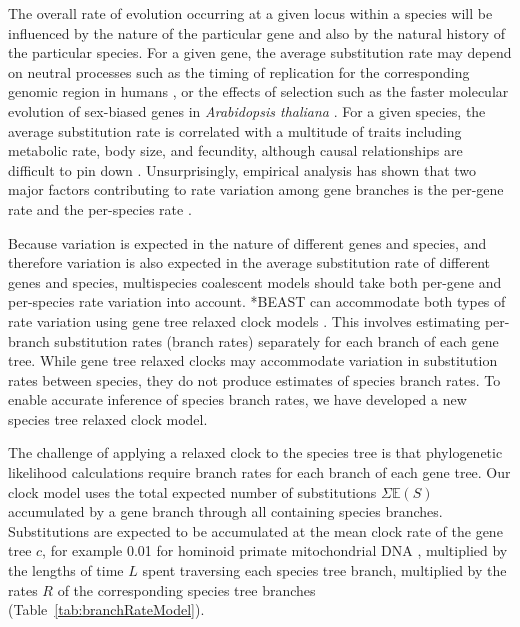 \documentclass[nogrid]{MBE}%
\begin{document}
The overall rate of evolution occurring at a given locus within a species will
be influenced by the nature of the particular gene and also by the natural
history of the particular species. For a given gene, the average substitution
rate may depend on neutral processes such as the timing of replication for the
corresponding genomic region in humans \citep{Stamatoyannopoulos2009}, or the
effects of selection such as the faster molecular evolution of sex-biased genes
in \textit{Arabidopsis thaliana} \citep{Gossmann01032014}. For a given species,
the average substitution rate is correlated with a multitude of traits including
metabolic rate, body size, and fecundity, although causal relationships are
difficult to pin down \citep{Bromham2503}. Unsurprisingly, empirical analysis
has shown that two major factors contributing to rate variation among gene
branches is the per-gene rate and the per-species rate
\citep{Rasmussen01122007}.

Because variation is expected in the nature of different genes and species, and
therefore variation is also expected in the average substitution rate of different
genes and species, multispecies coalescent models should take both per-gene and
per-species rate variation into account. *BEAST can accommodate both types of
rate variation using gene tree relaxed clock models \citep[for examples see][]{Berv2014120, Lambert2015146}.
This involves estimating per-branch substitution rates (branch rates) separately
for each branch of each gene tree. While gene tree relaxed clocks may
accommodate variation in substitution rates between species, they do not produce
estimates of species branch rates. To enable accurate inference of species
branch rates, we have developed a new species tree relaxed clock model.

The challenge of applying a relaxed clock to the species tree is that
phylogenetic likelihood calculations require branch rates for each branch of
each gene tree. Our clock model uses the total expected number of substitutions
$\Sigma \mathbb{E}(S)$ accumulated by a gene branch through all containing
species branches. Substitutions are expected to be accumulated at the mean
clock rate of the gene tree $c$, for example 0.01 for hominoid primate
mitochondrial DNA \citep{doi:10.1146/annurev.es.18.110187.001413}, multiplied
by the lengths of time $L$ spent traversing each species tree branch, multiplied
by the rates $R$ of the corresponding species tree branches
(Table~\ref{tab:branchRateModel}).
\end{document}
